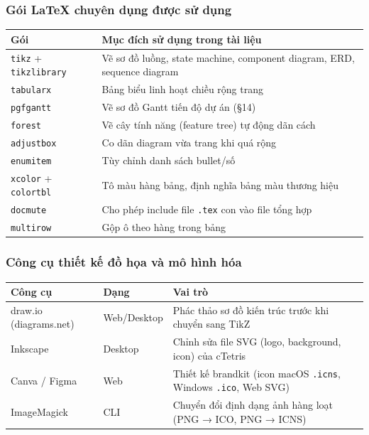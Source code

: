 \documentclass[12pt,a4paper]{article}
\begin{document}
\subsubsection{Gói LaTeX chuyên dụng được sử dụng}

\begin{tabularx}{\linewidth}{|l|X|}
\hline
\rowcolor{gray!20}
\textbf{Gói} & \textbf{Mục đích sử dụng trong tài liệu} \\
\hline
\texttt{tikz} + \texttt{tikzlibrary} & Vẽ sơ đồ luồng, state machine, component diagram, ERD, sequence diagram \\
\hline
\texttt{tabularx} & Bảng biểu linh hoạt chiều rộng trang \\
\hline
\texttt{pgfgantt} & Vẽ sơ đồ Gantt tiến độ dự án (§14) \\
\hline
\texttt{forest} & Vẽ cây tính năng (feature tree) tự động dãn cách \\
\hline
\texttt{adjustbox} & Co dãn diagram vừa trang khi quá rộng \\
\hline
\texttt{enumitem} & Tùy chỉnh danh sách bullet/số \\
\hline
\texttt{xcolor} + \texttt{colortbl} & Tô màu hàng bảng, định nghĩa bảng màu thương hiệu \\
\hline
\texttt{docmute} & Cho phép include file \texttt{.tex} con vào file tổng hợp \\
\hline
\texttt{multirow} & Gộp ô theo hàng trong bảng \\
\hline
\end{tabularx}

\subsubsection{Công cụ thiết kế đồ họa và mô hình hóa}

\begin{tabularx}{\linewidth}{|l|l|X|}
\hline
\rowcolor{gray!20}
\textbf{Công cụ} & \textbf{Dạng} & \textbf{Vai trò} \\
\hline
draw.io (diagrams.net) & Web/Desktop & Phác thảo sơ đồ kiến trúc trước khi chuyển sang TikZ \\
\hline
Inkscape & Desktop & Chỉnh sửa file SVG (logo, background, icon) của cTetris \\
\hline
Canva / Figma & Web & Thiết kế brandkit (icon macOS \texttt{.icns}, Windows \texttt{.ico}, Web SVG) \\
\hline
ImageMagick & CLI & Chuyển đổi định dạng ảnh hàng loạt (PNG → ICO, PNG → ICNS) \\
\hline
\end{tabularx}
\end{document}
